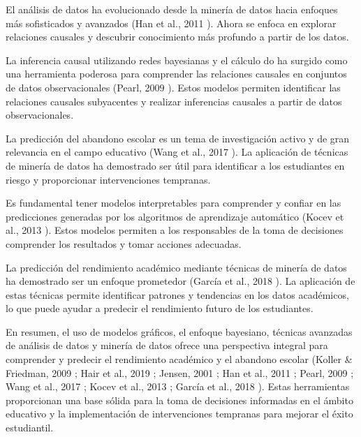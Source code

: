 El análisis de datos ha evolucionado desde la minería de datos hacia enfoques más sofisticados y avanzados (Han et al., 2011 \cite{han2011data}).
Ahora se enfoca en explorar relaciones causales y descubrir conocimiento más profundo a partir de los datos.

La inferencia causal utilizando redes bayesianas y el cálculo do ha surgido como una herramienta poderosa para comprender las relaciones
causales en conjuntos de datos observacionales (Pearl, 2009 \cite{pearl2009introduction}). Estos modelos permiten identificar las relaciones
causales subyacentes y realizar inferencias causales a partir de datos observacionales.

La predicción del abandono escolar es un tema de investigación activo y de gran relevancia en el campo educativo (Wang et al., 2017 \cite{wang2017literature}).
La aplicación de técnicas de minería de datos ha demostrado ser útil para identificar a los estudiantes en riesgo y proporcionar intervenciones tempranas.

Es fundamental tener modelos interpretables para comprender y confiar en las predicciones generadas por los algoritmos de aprendizaje automático
(Kocev et al., 2013 \cite{kocev2013need}). Estos modelos permiten a los responsables de la toma de decisiones comprender los resultados y tomar
acciones adecuadas.

La predicción del rendimiento académico mediante técnicas de minería de datos ha demostrado ser un enfoque prometedor
(García et al., 2018 \cite{garcia2018prediccion}). La aplicación de estas técnicas permite identificar patrones y tendencias en los datos académicos,
lo que puede ayudar a predecir el rendimiento futuro de los estudiantes.

En resumen, el uso de modelos gráficos, el enfoque bayesiano, técnicas avanzadas de análisis de datos y minería de datos ofrece una perspectiva integral para
comprender y predecir el rendimiento académico y el abandono escolar (Koller \& Friedman, 2009 \cite{koller2009introduction};
Hair et al., 2019 \cite{hair2019advanced}; Jensen, 2001 \cite{jensen2001bayesian}; Han et al., 2011 \cite{han2011data}; Pearl, 2009 \cite{pearl2009introduction};
Wang et al., 2017 \cite{wang2017literature}; Kocev et al., 2013 \cite{kocev2013need}; García et al., 2018 \cite{garcia2018prediccion}).
Estas herramientas proporcionan una base sólida para la toma de decisiones informadas en el ámbito educativo y la implementación de intervenciones tempranas
para mejorar el éxito estudiantil.

